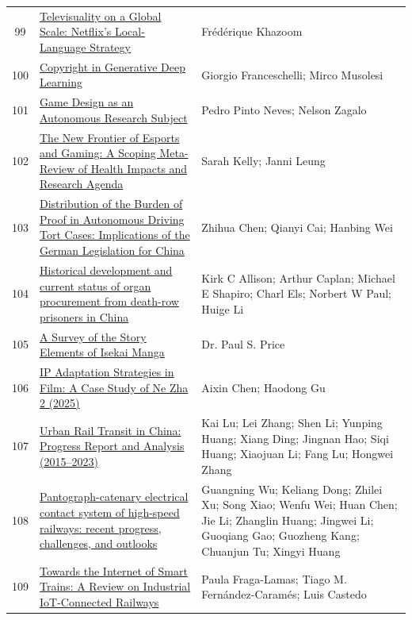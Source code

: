 \documentclass[11pt]{article}
\begin{document}
\begin{longtable}{cp{8cm}p{5cm}}
  99 & \href{https://www.cogitatiopress.com/mediaandcommunication/article/view/9356}{Televisuality on a Global Scale: Netflix's Local-Language Strategy} & Frédérique Khazoom \\
  100 & \href{https://arxiv.org/abs/2105.09266}{Copyright in Generative Deep Learning} & Giorgio Franceschelli; Mirco Musolesi \\
  101 & \href{https://www.mdpi.com/2078-2489/12/9/367}{Game Design as an Autonomous Research Subject} & Pedro Pinto Neves; Nelson Zagalo \\
  102 & \href{https://www.frontiersin.org/journals/sports-and-active-living/articles/10.3389/fspor.2021.640362/full}{The New Frontier of Esports and Gaming: A Scoping Meta-Review of Health Impacts and Research Agenda} & Sarah Kelly; Janni Leung \\
  103 & \href{https://www.mdpi.com/2032-6653/15/7/305}{Distribution of the Burden of Proof in Autonomous Driving Tort Cases: Implications of the German Legislation for China} & Zhihua Chen; Qianyi Cai; Hanbing Wei \\
  104 & \href{https://bmcmedethics.biomedcentral.com/articles/10.1186/s12910-015-0074-0}{Historical development and current status of organ procurement from death-row prisoners in China} & Kirk C Allison; Arthur Caplan; Michael E Shapiro; Charl Els; Norbert W Paul; Huige Li \\
  105 & \href{https://iopn.library.illinois.edu/journals/jams/article/view/808}{A Survey of the Story Elements of Isekai Manga} & Dr. Paul S. Price \\
  106 & \href{https://www.mdpi.com/2076-0752/14/4/85}{IP Adaptation Strategies in Film: A Case Study of Ne Zha 2 (2025)} & Aixin Chen; Haodong Gu \\
  107 & \href{https://link.springer.com/article/10.1007/s40864-024-00231-7}{Urban Rail Transit in China: Progress Report and Analysis (2015–2023)} & Kai Lu; Lei Zhang; Shen Li; Yunping Huang; Xiang Ding; Jingnan Hao; Siqi Huang; Xiaojuan Li; Fang Lu; Hongwei Zhang \\
  108 & \href{https://link.springer.com/article/10.1007/s40534-022-00281-2}{Pantograph-catenary electrical contact system of high-speed railways: recent progress, challenges, and outlooks} & Guangning Wu; Keliang Dong; Zhilei Xu; Song Xiao; Wenfu Wei; Huan Chen; Jie Li; Zhanglin Huang; Jingwei Li; Guoqiang Gao; Guozheng Kang; Chuanjun Tu; Xingyi Huang \\
  109 & \href{https://www.mdpi.com/1424-8220/17/6/1457}{Towards the Internet of Smart Trains: A Review on Industrial IoT-Connected Railways} & Paula Fraga-Lamas; Tiago M. Fernández-Caramés; Luis Castedo \\

\end{longtable}
\end{document}
